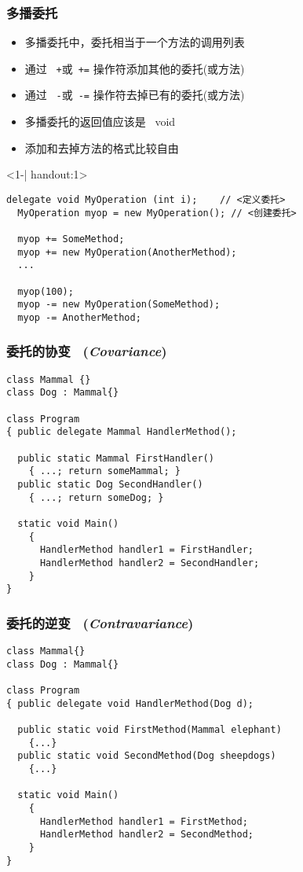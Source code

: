 \begin{frame}[fragile]
\frametitle{多播委托}
\begin{itemize}
\setlength{\itemsep}{4pt plus 1pt}
\item<1-| handout:1> 多播委托中，委托相当于一个方法的调用列表
\item<2-| handout:1> 通过 ~\texttt{+}或~\texttt{+=} 操作符添加其他的委托(或方法)
\item<2-| handout:1> 通过 ~\texttt{-}或~\texttt{-=} 操作符去掉已有的委托(或方法)
\item<3-| handout:1> 多播委托的返回值应该是 ~void
\item<3-| handout:1> 添加和去掉方法的格式比较自由
\end{itemize}
\begin{onlyenv}<1-| handout:1>
\begin{lstlisting}[escapeinside=<>]
  delegate void MyOperation (int i);    // <定义委托>
  MyOperation myop = new MyOperation(); // <创建委托>

  myop += SomeMethod;
  myop += new MyOperation(AnotherMethod);
  ...

  myop(100);
  myop -= new MyOperation(SomeMethod);
  myop -= AnotherMethod;

\end{lstlisting}
\end{onlyenv}
\end{frame}

\begin{frame}[fragile]
\frametitle{委托的协变~ (\textit{Covariance})}
\begin{lstlisting}
class Mammal {}
class Dog : Mammal{}

class Program
{ public delegate Mammal HandlerMethod();

  public static Mammal FirstHandler()  
    { ...; return someMammal; }
  public static Dog SecondHandler()
    { ...; return someDog; }

  static void Main() 
    {
      HandlerMethod handler1 = FirstHandler;
      HandlerMethod handler2 = SecondHandler;
    }
}
\end{lstlisting}
\end{frame}

\begin{frame}[fragile]
\frametitle{委托的逆变~ (\textit{Contravariance})}
\begin{lstlisting}
class Mammal{}
class Dog : Mammal{}
 
class Program
{ public delegate void HandlerMethod(Dog d);
 
  public static void FirstMethod(Mammal elephant)
    {...}
  public static void SecondMethod(Dog sheepdogs)
    {...}
 
  static void Main()
    {
      HandlerMethod handler1 = FirstMethod;
      HandlerMethod handler2 = SecondMethod;
    }
}
\end{lstlisting}
\end{frame}

